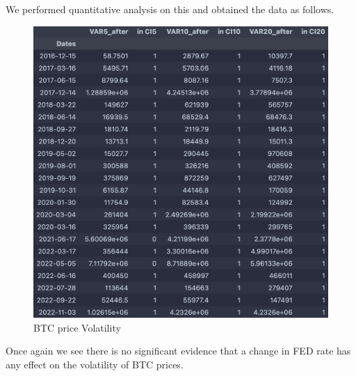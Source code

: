 \documentclass[12pt]{article}
\begin{document}
\noindent We performed quantitative analysis on this and obtained the data as follows.

\begin{figure}[H]
   \includegraphics[scale=0.7]{research_project/text/paper/7.png}
   \centering
   \caption{BTC price Volatility}
   \label{fig:FED Rate evolution 2016 - 2022}
\end{figure}
Once again we see there is no significant evidence that a change in FED rate has any effect on the volatility of BTC prices.
\end{document}
